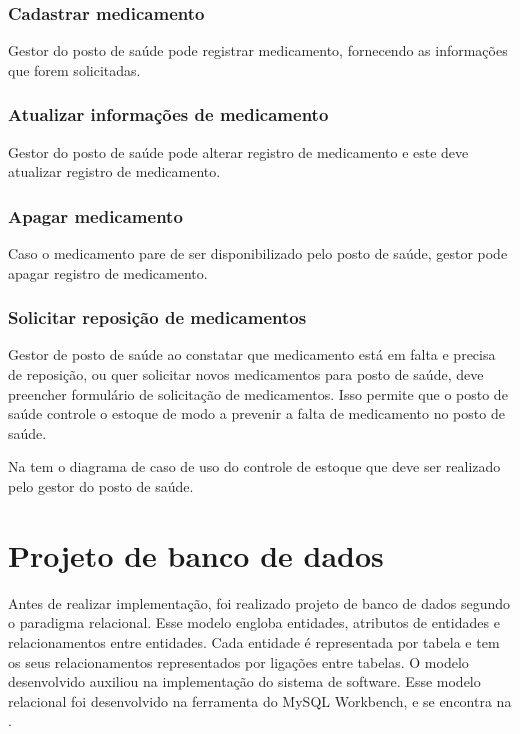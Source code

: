 \subsubsection{Cadastrar medicamento}

Gestor do posto de saúde pode registrar medicamento, fornecendo as informações que forem solicitadas.

\subsubsection{Atualizar informações de medicamento}

Gestor do posto de saúde pode alterar registro de medicamento e este deve atualizar registro de medicamento. 

\subsubsection{Apagar medicamento}

Caso o medicamento pare de ser disponibilizado pelo posto de saúde, gestor pode apagar registro de medicamento.

\subsubsection{Solicitar reposição de medicamentos}
Gestor de posto de saúde ao constatar que medicamento está em falta e precisa de reposição, ou quer solicitar novos medicamentos para posto de saúde, deve preencher formulário de solicitação de medicamentos. Isso permite que o posto de saúde controle o estoque de modo a prevenir a falta de medicamento no posto de saúde.

Na  tem o diagrama de caso de uso do controle de estoque que deve ser realizado pelo gestor do posto de saúde.

%

\section{Projeto de banco de dados}
Antes de realizar implementação, foi realizado projeto de banco de dados segundo o paradigma relacional. Esse modelo engloba entidades, atributos de entidades e relacionamentos entre  entidades. Cada entidade é representada por tabela e tem os seus relacionamentos representados por ligações entre tabelas. O modelo desenvolvido auxiliou na implementação do sistema de software. Esse modelo relacional foi desenvolvido na ferramenta do MySQL Workbench, e se encontra na  .


